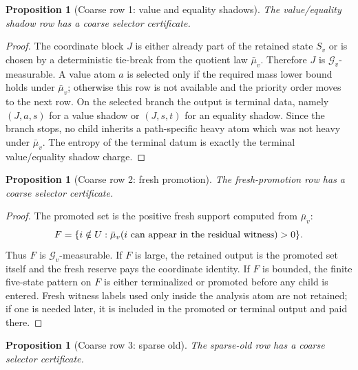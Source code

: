 \documentclass[11pt]{article}
\newtheorem{proposition}[theorem]{Proposition}
\theoremstyle{remark}
\newcommand{\G}{\mathcal G}
\begin{document}
\begin{proposition}[Coarse row 1: value and equality shadows]\label{prop:coarse-row-value}
The value/equality shadow row has a coarse selector certificate.
\end{proposition}

\begin{proof}
The coordinate block $J$ is either already part of the retained state $S_v$ or is chosen by a deterministic tie-break from the quotient law $\bar\mu_v$.  Therefore $J$ is $\G_v$-measurable.  A value atom $a$ is selected only if the required mass lower bound holds under $\bar\mu_v$; otherwise this row is not available and the priority order moves to the next row.  On the selected branch the output is terminal data, namely $(J,a,s)$ for a value shadow or $(J,s,t)$ for an equality shadow.  Since the branch stops, no child inherits a path-specific heavy atom which was not heavy under $\bar\mu_v$.  The entropy of the terminal datum is exactly the terminal value/equality shadow charge.
\end{proof}

\begin{proposition}[Coarse row 2: fresh promotion]\label{prop:coarse-row-fresh}
The fresh-promotion row has a coarse selector certificate.
\end{proposition}

\begin{proof}
The promoted set is the positive fresh support computed from $\bar\mu_v$:
\[
        F=\{i\notin U:\bar\mu_v(i\hbox{ can appear in the residual witness})>0\}.
\]
Thus $F$ is $\G_v$-measurable.  If $F$ is large, the retained output is the promoted set itself and the fresh reserve pays the coordinate identity.  If $F$ is bounded, the finite five-state pattern on $F$ is either terminalized or promoted before any child is entered.  Fresh witness labels used only inside the analysis atom are not retained; if one is needed later, it is included in the promoted or terminal output and paid there.
\end{proof}

\begin{proposition}[Coarse row 3: sparse old]\label{prop:coarse-row-sparse-old}
The sparse-old row has a coarse selector certificate.
\end{proposition}
\end{document}
